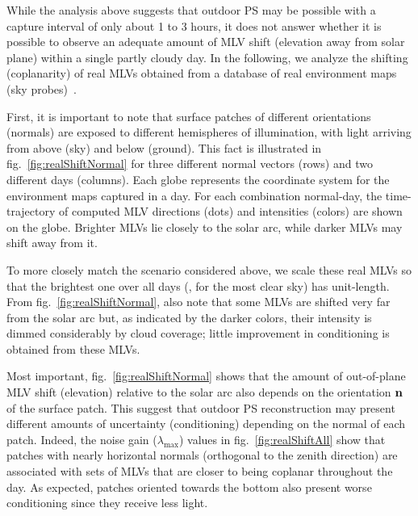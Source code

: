 
While the analysis above suggests that outdoor PS may be possible with a capture interval of only about 1 to 3 hours, it does not answer whether it is possible to observe an adequate amount of MLV shift (elevation away from solar plane) within a single partly cloudy day. In the following, we analyze the shifting (coplanarity) of real MLVs obtained from a database of real environment maps (sky probes)~\cite{holdgeoffroy-iccp-15}.


First, it is important to note that surface patches of different orientations (normals) are exposed to different hemispheres of illumination, with light arriving from above (sky) and below (ground). This fact is illustrated in fig.~\ref{fig:realShiftNormal} for three different normal vectors (rows) and two different days (columns). Each globe represents the coordinate system for the environment maps captured in a day. For each combination normal-day, the time-trajectory of computed MLV directions (dots) and intensities (colors) are shown on the globe. Brighter MLVs lie closely to the solar arc, while darker MLVs may shift away from it. 

To more closely match the scenario considered above, we scale these real MLVs so that the brightest one over all days (\ie, for the most clear sky) has unit-length. From fig.~\ref{fig:realShiftNormal}, also note that some MLVs are shifted very far from the solar arc but, as indicated by the darker colors, their intensity is dimmed considerably by cloud coverage; little improvement in conditioning is obtained from these MLVs.

Most important, fig.~\ref{fig:realShiftNormal} shows that the amount of out-of-plane MLV shift (elevation) relative to the solar arc also depends on the orientation ${\bf n}$ of the surface patch. This suggest that outdoor PS reconstruction may present different amounts of uncertainty (conditioning) depending on the normal of each patch. Indeed, the noise gain ($\lambda_{\max}$) values in fig.~\ref{fig:realShiftAll} show that patches with nearly horizontal normals (orthogonal to the zenith direction) are associated with sets of MLVs that are closer to being coplanar throughout the day. As expected, patches oriented towards the bottom also present worse conditioning since they receive less light.

